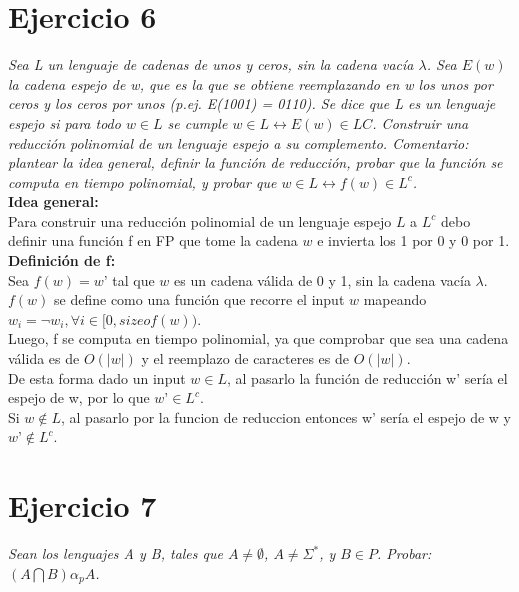 \documentclass[lnbip]{svmultln}
\begin{document}
\section{Ejercicio 6} 

\textit{Sea L un lenguaje de cadenas de unos y ceros, sin la cadena vacía $\lambda$. Sea $E(w)$ la cadena espejo de w, que es la que se obtiene reemplazando en w los unos por ceros y los ceros por unos (p.ej. E(1001) = 0110). Se dice que L es un lenguaje espejo si para todo $w \in L$ se cumple $w \in L \leftrightarrow E(w) \in LC$. Construir una reducción polinomial de un lenguaje espejo a su complemento. Comentario: plantear la idea general, definir la función de reducción, probar que la función se computa en tiempo polinomial, y probar que $w \in L \leftrightarrow f(w) \in L^{c}$.} \\

\textbf{Idea general:} \\

Para construir una reducción polinomial de un lenguaje espejo $L$ a $L^{c}$ debo definir una función f en FP que tome la cadena $w$ e invierta los 1 por 0 y 0 por 1. \\

\textbf{Definición de f:} \\

Sea $f(w) = w’$ tal que $w$ es un cadena válida de 0 y 1, sin la cadena vacía $\lambda$. $f(w)$ se define como una función que recorre el input $w$ mapeando $w_i = \neg w_i, \forall i \in [0, sizeof(w))$. \\

Luego, f se computa en tiempo polinomial, ya que comprobar que sea una cadena válida es de $O(|w|)$ y el reemplazo de caracteres es de $O(|w|)$. \\

De esta forma dado un input $w \in L$, al pasarlo la función de reducción w’ sería el espejo de w, por lo que $w’ \in L^{c}$. \\

Si $w \notin L$, al pasarlo por la funcion de reduccion entonces w’ sería el espejo de w y $w’ \notin L^{c}$. \\

\section{Ejercicio 7}

\textit{Sean los lenguajes A y B, tales que $A \ne \emptyset$, $A \ne \Sigma^{*}$, y $B \in P$. Probar: $(A \bigcap B) \alpha_{p} A$.} \\
\end{document}
